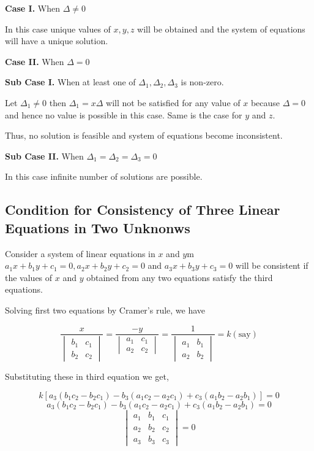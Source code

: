 \textbf{Case I.} When $\Delta \neq 0$

In this case unique values of $x, y, z$ will be obtained and the system of equations will have a unique solution.

\textbf{Case II.} When $\Delta = 0$

\textbf{Sub Case I.} When at least one of $\Delta_1, \Delta_2, \Delta_3$ is non-zero.

Let $\Delta_1 \neq 0$ then $\Delta_1 = x\Delta$ will not be
satisfied for any value of $x$ because $\Delta = 0$ and hence no
value is possible in this case. Same is the case for $y$ and $z$.

Thus, no solution is feasible and system of equations become inconsistent.

\textbf{Sub Case II.} When $\Delta_1 = \Delta_2 = \Delta_3 = 0$

In this case infinite number of solutions are possible.

\subsection{Condition for Consistency of Three Linear Equations in Two Unknonws}
Consider a system of linear equations in $x$ and $y$m $a_1x + b_1y + c_1 = 0, a_2x + b_2y + c_2 = 0$ and $a_3x+ b_3y + c_3 = 0$
will be consistent if the values of $x$ and $y$ obtained from any two equations satisfy the third equations.

Solving first two equations by Cramer's rule, we have

$$\frac{x}{\begin{vmatrix}b_1 & c_1\\b_2 & c_2\end{vmatrix}} =
\frac{-y}{\begin{vmatrix}a_1 & c_1\\a_2 & c_2\end{vmatrix}} =
\frac{1}{\begin{vmatrix}a_1 & b_1\\a_2 & b_2\end{vmatrix}} = k(\text{say})$$

Substituting these in third equation we get,

$$k[a_3(b_1c_2 - b_2c_1) - b_3(a_1c_2 - a_2c_1) + c_3(a_1b_2 - a_2b_1)] = 0$$
$$a_3(b_1c_2 - b_2c_1) - b_3(a_1c_2 - a_2c_1) + c_3(a_1b_2 - a_2b_1) = 0$$
$$\begin{vmatrix}a_1&b_1&c_1\\a_2&b_2&c_2\\a_3&b_3&c_3\end{vmatrix} = 0$$

